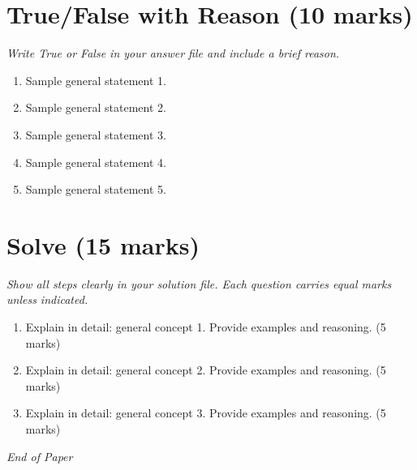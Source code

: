 \documentclass[12pt]{article}
\begin{document}
\section*{True/False with Reason (10 marks)}
\textit{Write True or False in your answer file and include a brief reason.}

\begin{enumerate}[label=\arabic*.]

\item Sample general statement 1.

\item Sample general statement 2.

\item Sample general statement 3.

\item Sample general statement 4.

\item Sample general statement 5.

\end{enumerate}

\section*{Solve (15 marks)}
\textit{Show all steps clearly in your solution file. Each question carries equal marks unless indicated.}

\begin{enumerate}[label=\arabic*.]

\item Explain in detail: general concept 1. Provide examples and reasoning.  \hfill (5 marks)

\item Explain in detail: general concept 2. Provide examples and reasoning.  \hfill (5 marks)

\item Explain in detail: general concept 3. Provide examples and reasoning.  \hfill (5 marks)

\end{enumerate}


\vfill
\noindent\textit{End of Paper}
\end{document}
